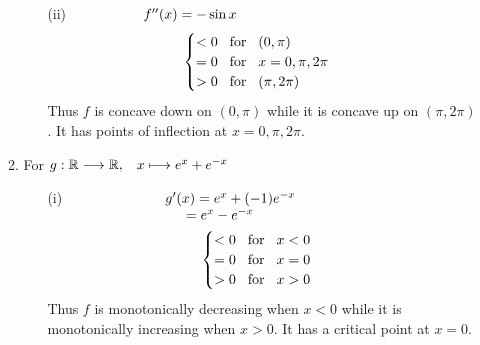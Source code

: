 \documentclass[12pt]{amsart}
\begin{document}
\begin{enumerate}
\begin{enumerate}
\begin{enumerate}
					\item[(ii)]
						$\text{ } \hspace{1.7cm} f''(x) = -\sin x$
						\begin{align}
							\begin{cases}
								< 0 \hspace{0.3cm} \text{for} \hspace{0.3cm} (0, \pi) \notag \\
								= 0 \hspace{0.3cm} \text{for} \hspace{0.3cm} x=0, \pi, 2\pi \notag \\
								> 0 \hspace{0.3cm} \text{for} \hspace{0.3cm} (\pi, 2\pi) \notag
							\end{cases}
						\end{align}
						Thus $f$ is concave down on $(0,\pi)$ while it is concave up on $(\pi,2\pi)$.
						It has points of inflection at $x=0,\pi,2\pi$. \\
				\end{enumerate}

			\item For $g: \mathbb{R} \longrightarrow \mathbb{R}, \hspace{0.3cm} x \longmapsto 
			e^x + e^{-x}$
				\begin{enumerate}
					\item[(i)] $\text{ } \hspace{2.35cm} g'(x) = e^x+(-1)e^{-x}$ \\
					 $\text{ } \hspace{3.25cm} = e^x-e^{-x}$
						\begin{align}
							\begin{cases}
								< 0 \hspace{0.3cm} \text{for} \hspace{0.3cm} x < 0 \notag \\
								= 0 \hspace{0.3cm} \text{for} \hspace{0.3cm} x = 0 \notag \\
								> 0 \hspace{0.3cm} \text{for} \hspace{0.3cm} x > 0 \notag
							\end{cases}
						\end{align} 
						Thus $f$ is monotonically decreasing when $x<0$ while it is monotonically 							increasing when $x>0$. It has a critical point at $x=0$. \\
											

\end{enumerate}
\end{enumerate}
\end{enumerate}
\end{document}

